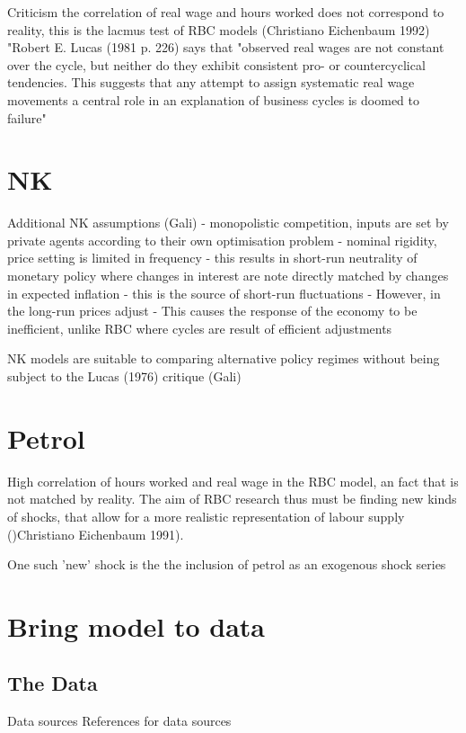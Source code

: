 \documentclass[11pt,a4paper,english]{article} %
\begin{document}
	Criticism
	the correlation of real wage and hours worked does not correspond to reality, this is the lacmus test of RBC models (Christiano Eichenbaum 1992)
	"Robert E. Lucas (1981 p. 226) says that "observed real wages are not constant over the cycle, but neither do they exhibit consistent pro- or countercyclical tendencies. This suggests that any attempt to assign systematic real wage movements a central role in an explanation of business cycles is doomed to failure" \cite{christiano_current_1992}
	
	
	\section{NK}
	
	Additional NK assumptions (Gali)
	- monopolistic competition, inputs are set by private agents according to their own optimisation problem
	- nominal rigidity, price setting is limited in frequency
		- this results in short-run neutrality of monetary policy where changes in interest are note directly matched by changes in expected inflation
		- this is the source of short-run fluctuations
		- However, in the long-run prices adjust 
	- This causes the response of the economy to be inefficient, unlike RBC where cycles are result of efficient adjustments
	
	NK models are suitable to comparing alternative policy regimes without being subject to the Lucas (1976) critique (Gali)
	
	
	\section{Petrol}
	High correlation of hours worked and real wage in the RBC model, an fact that is not matched by reality. The aim of RBC research thus must be finding new kinds of shocks, that allow for a more realistic representation of labour supply ()Christiano Eichenbaum 1991).
	
	
	One such 'new' shock is the the inclusion of petrol as an exogenous shock series \cite{kim_role_1992}
	
	
	
	
	
	
	\section{Bring model to data}
	
	\subsection{The Data}
	Data sources
	References for data sources
\end{document}
